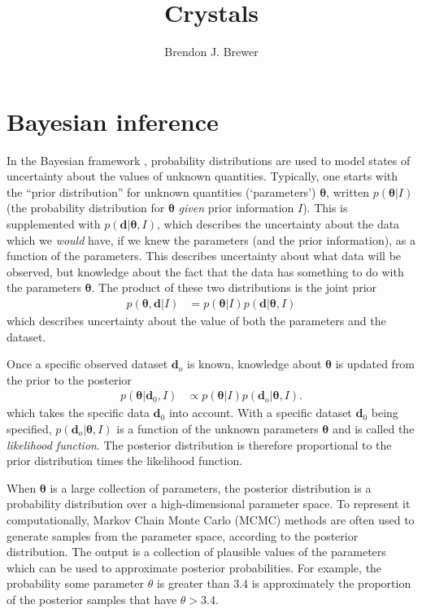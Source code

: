 \documentclass[a4paper, 12pt]{elsarticle}
\title{Crystals}
\author{Brendon J. Brewer}
\date{}
\newcommand{\params}{\boldsymbol{\theta}}
\newcommand{\data}{\boldsymbol{d}}
\newcommand{\info}{I}
\begin{document}
\maketitle


\setlength{\parindent}{0pt}
\setlength{\parskip}{8pt}

\section{Bayesian inference}
In the Bayesian framework
\citep{gregory2005bayesian, o2004kendall, sivia2006data},
probability distributions are used to model
states of uncertainty about the values of unknown quantities.
Typically, one starts with the ``prior distribution''
for unknown quantities (`parameters') $\params$, written $p(\params | \info)$
(the probability distribution for $\params$ {\em given} prior information
$\info$). This is supplemented with $p(\data | \params, \info)$,
which describes the uncertainty about the data which we {\em would} have,
if we knew the parameters (and the prior information), as a function of
the parameters. This describes uncertainty about what data will be observed,
but knowledge about the fact that the data has something to do with the
parameters $\params$.
The
product of these two distributions is the joint prior
\begin{align}
p(\params, \data | \info) &= p(\params | \info)p(\data | \params, \info)
\end{align}
which describes uncertainty about the value of both the parameters and the
dataset.

Once a specific observed dataset $\data_o$ is known, knowledge about
$\params$ is updated from the prior to the posterior
\begin{align}
p(\params | \data_0, \info) &\propto
    p(\params | \info)p(\data_o | \params, \info).
\end{align}
which takes the specific data $\data_0$ into account. With a specific dataset
$\data_0$ being specified, $p(\data_o | \params,\info)$ is a function of the
unknown parameters $\params$ and is called the {\em likelihood function}.
The posterior distribution is therefore proportional to the prior distribution
times the likelihood function.

When $\params$ is a large collection of parameters, the posterior distribution
is a probability distribution over a high-dimensional parameter space. To
represent it computationally, Markov Chain Monte Carlo (MCMC) methods are
often used to generate samples from the parameter space, according to the
posterior distribution. The output is a collection of plausible values of the
parameters which can be used to approximate posterior probabilities.
For example, the probability some parameter $\theta$ is greater than 3.4
is approximately the proportion of the posterior samples that have
$\theta > 3.4$.
\end{document}
